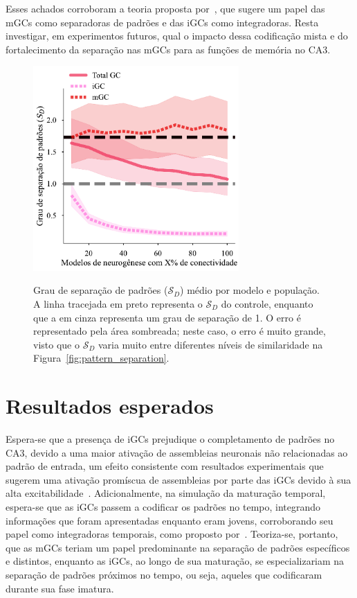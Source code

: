 Esses achados corroboram a teoria proposta por~, que sugere um papel das mGCs como separadoras de
padrões e das iGCs como integradoras. Resta investigar, em experimentos futuros, qual o impacto dessa codificação mista e do
fortalecimento da separação nas mGCs para as funções de memória no CA3.

\begin{figure}
    \centering
    \caption{Grau de separação de padrões ($\mathcal{S}_D$) médio por modelo e população. A linha tracejada em preto representa o
    $\mathcal{S}_D$ do controle, enquanto que a em cinza representa um grau de separação de 1. O erro é representado pela área
    sombreada; neste caso, o erro é muito grande, visto que o $\mathcal{S}_D$ varia muito entre diferentes níveis de similaridade
    na Figura~\ref{fig:pattern_separation}.}
    \includegraphics[width=0.7\textwidth]{figuras/plots/avg_pattern_separation}
    \label{fig:avg_pattern_separation}
\end{figure}


\section{Resultados esperados}

Espera-se que a presença de iGCs prejudique o completamento de padrões no CA3, devido a uma maior ativação de assembleias
neuronais não relacionadas ao padrão de entrada, um efeito consistente com resultados experimentais que sugerem uma ativação
promíscua de assembleias por parte das iGCs devido à sua alta excitabilidade~\cite{koSystems2025}. Adicionalmente, na simulação da
maturação temporal, espera-se que as iGCs passem a codificar os padrões no tempo, integrando informações que foram apresentadas
enquanto eram jovens, corroborando seu papel como integradoras temporais, como proposto por~\cite{aimoneComputational2009}.
Teoriza-se, portanto, que as mGCs teriam um papel predominante na separação de padrões específicos e distintos, enquanto as iGCs,
ao longo de sua maturação, se especializariam na separação de padrões próximos no tempo, ou seja, aqueles que codificaram durante
sua fase imatura.
